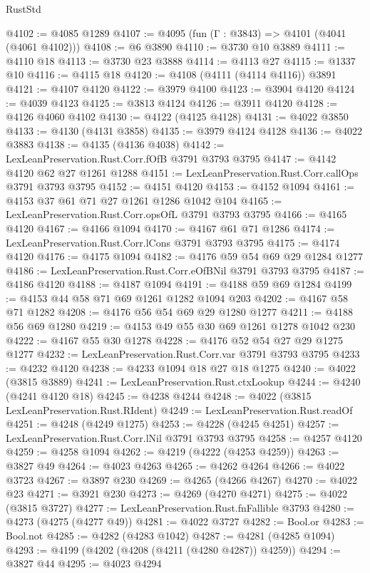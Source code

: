 \begin{lexlean}{RustStd}
\begin{coremodule}
{\begin{coremodule}
{{{{{{{{{{{{{{{{{{{{{{{{{{{{{{{{{{{@4102 := @4085 @1289
@4107 := @4095 (fun (Γ : @3843) => @4101 (@4041 (@4061 @4102)))
@4108 := @6 @3890
@4110 := @3730 @10 @3889
@4111 := @4110 @18
@4113 := @3730 @23 @3888
@4114 := @4113 @27
@4115 := @1337 @10
@4116 := @4115 @18
@4120 := @4108 (@4111 (@4114 @4116)) @3891
@4121 := @4107 @4120
@4122 := @3979 @4100
@4123 := @3904 @4120
@4124 := @4039 @4123
@4125 := @3813 @4124
@4126 := @3911 @4120
@4128 := @4126 @4060 @4102
@4130 := @4122 (@4125 @4128)
@4131 := @4022 @3850
@4133 := @4130 (@4131 @3858)
@4135 := @3979 @4124 @4128
@4136 := @4022 @3883
@4138 := @4135 (@4136 @4038)
@4142 := LexLeanPreservation.Rust.Corr.fOfB @3791 @3793 @3795
@4147 := @4142 @4120 @62 @27 @1261 @1288
@4151 := LexLeanPreservation.Rust.Corr.callOps @3791 @3793 @3795
@4152 := @4151 @4120
@4153 := @4152 @1094
@4161 := @4153 @37 @61 @71 @27 @1261 @1286 @1042 @104
@4165 := LexLeanPreservation.Rust.Corr.opsOfL @3791 @3793 @3795
@4166 := @4165 @4120
@4167 := @4166 @1094
@4170 := @4167 @61 @71 @1286
@4174 := LexLeanPreservation.Rust.Corr.lCons @3791 @3793 @3795
@4175 := @4174 @4120
@4176 := @4175 @1094
@4182 := @4176 @59 @54 @69 @29 @1284 @1277
@4186 := LexLeanPreservation.Rust.Corr.eOfBNil @3791 @3793 @3795
@4187 := @4186 @4120
@4188 := @4187 @1094
@4191 := @4188 @59 @69 @1284
@4199 := @4153 @44 @58 @71 @69 @1261 @1282 @1094 @203
@4202 := @4167 @58 @71 @1282
@4208 := @4176 @56 @54 @69 @29 @1280 @1277
@4211 := @4188 @56 @69 @1280
@4219 := @4153 @49 @55 @30 @69 @1261 @1278 @1042 @230
@4222 := @4167 @55 @30 @1278
@4228 := @4176 @52 @54 @27 @29 @1275 @1277
@4232 := LexLeanPreservation.Rust.Corr.var @3791 @3793 @3795
@4233 := @4232 @4120
@4238 := @4233 @1094 @18 @27 @18 @1275
@4240 := @4022 (@3815 @3889)
@4241 := LexLeanPreservation.Rust.ctxLookup
@4244 := @4240 (@4241 @4120 @18)
@4245 := @4238 @4244
@4248 := @4022 (@3815 LexLeanPreservation.Rust.RIdent)
@4249 := LexLeanPreservation.Rust.readOf
@4251 := @4248 (@4249 @1275)
@4253 := @4228 (@4245 @4251)
@4257 := LexLeanPreservation.Rust.Corr.lNil @3791 @3793 @3795
@4258 := @4257 @4120
@4259 := @4258 @1094
@4262 := @4219 (@4222 (@4253 @4259))
@4263 := @3827 @49
@4264 := @4023 @4263
@4265 := @4262 @4264
@4266 := @4022 @3723
@4267 := @3897 @230
@4269 := @4265 (@4266 @4267)
@4270 := @4022 @23
@4271 := @3921 @230
@4273 := @4269 (@4270 @4271)
@4275 := @4022 (@3815 @3727)
@4277 := LexLeanPreservation.Rust.fnFallible @3793
@4280 := @4273 (@4275 (@4277 @49))
@4281 := @4022 @3727
@4282 := Bool.or
@4283 := Bool.not
@4285 := @4282 (@4283 @1042)
@4287 := @4281 (@4285 @1094)
@4293 := @4199 (@4202 (@4208 (@4211 (@4280 @4287)) @4259))
@4294 := @3827 @44
@4295 := @4023 @4294
}}}}}}}}}}}}}}}}}}}}}}}}}}}}}}}}}}}
\end{coremodule}}
\end{coremodule}
\end{lexlean}
